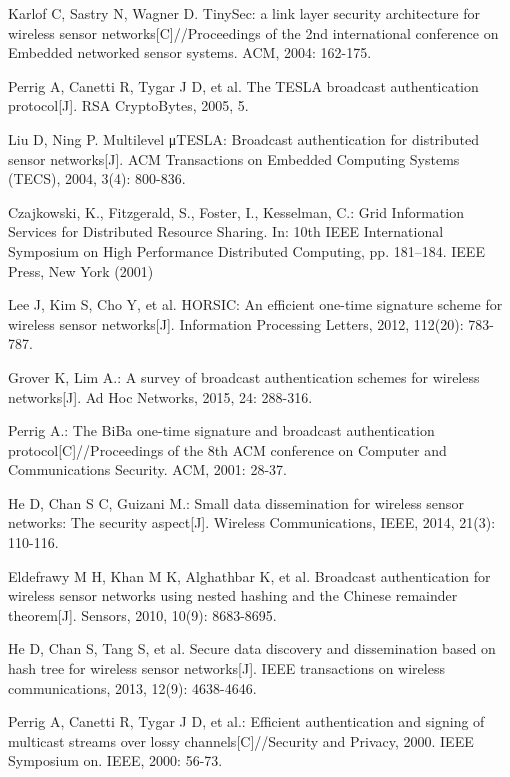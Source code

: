 \documentclass{sig-alternate-05-2015}
\begin{document}
\begin{thebibliography}{13}

 Karlof C, Sastry N, Wagner D. TinySec: a link layer security architecture for wireless sensor networks[C]//Proceedings of the 2nd international conference on Embedded networked sensor systems. ACM, 2004: 162-175.

 Perrig A, Canetti R, Tygar J D, et al. The TESLA broadcast authentication protocol[J]. RSA CryptoBytes, 2005, 5.

Liu D, Ning P. Multilevel μTESLA: Broadcast authentication for distributed sensor networks[J]. ACM Transactions on Embedded Computing Systems (TECS), 2004, 3(4): 800-836.

 Czajkowski, K., Fitzgerald, S., Foster, I., Kesselman, C.: Grid
Information Services for Distributed Resource Sharing. In: 10th IEEE
International Symposium on High Performance Distributed Computing, pp.
181--184. IEEE Press, New York (2001)

 Lee J, Kim S, Cho Y, et al. HORSIC: An efficient one-time signature scheme for wireless sensor networks[J]. Information Processing Letters, 2012, 112(20): 783-787.

 Grover K, Lim A.: A survey of broadcast authentication schemes for wireless networks[J]. Ad Hoc Networks, 2015, 24: 288-316.

 Perrig A.: The BiBa one-time signature and broadcast authentication protocol[C]//Proceedings of the 8th ACM conference on Computer and Communications Security. ACM, 2001: 28-37.

 He D, Chan S C, Guizani M.: Small data dissemination for wireless sensor networks: The security aspect[J]. Wireless Communications, IEEE, 2014, 21(3): 110-116.

 Eldefrawy M H, Khan M K, Alghathbar K, et al. Broadcast authentication for wireless sensor networks using nested hashing and the Chinese remainder theorem[J]. Sensors, 2010, 10(9): 8683-8695.

He D, Chan S, Tang S, et al. Secure data discovery and dissemination based on hash tree for wireless sensor networks[J]. IEEE transactions on wireless communications, 2013, 12(9): 4638-4646.

 Perrig A, Canetti R, Tygar J D, et al.: Efficient authentication and signing of multicast streams over lossy channels[C]//Security and Privacy, 2000. IEEE Symposium on. IEEE, 2000: 56-73.%


\end{thebibliography}
\end{document}
